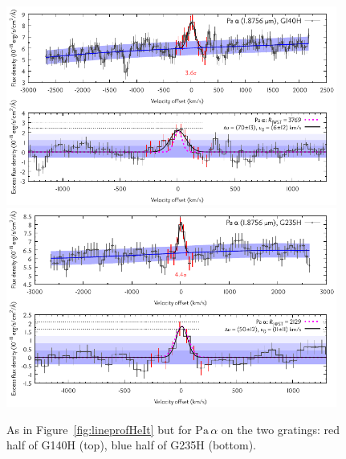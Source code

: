 \documentclass[twocolumn,twocolumnappendix]{aastex631}
\def\Paa{\ensuremath{\mathrm{Pa}\,\alpha}\xspace}           %
\begin{document}
\begin{figure}
 \centering
 \includegraphics[width=0.97\textwidth]{TWA27b_g140h-f100lp_rood_sigkorr_Paa_Dv2700_ohni300_Abb_simul.pdf}
 \includegraphics[width=0.97\textwidth]{TWA27b_g235h-f170lp_blauw_sigkorr_Paa_Dv2700_ohni300_Abb_simul.pdf}
\caption{%
As in Figure~\ref{fig:lineprofHeIt} but for \Paa on the two gratings: red half of G140H (top), blue half of G235H (bottom).
%
}
\label{fig:lineprofPaa2}
\end{figure}
\end{document}
